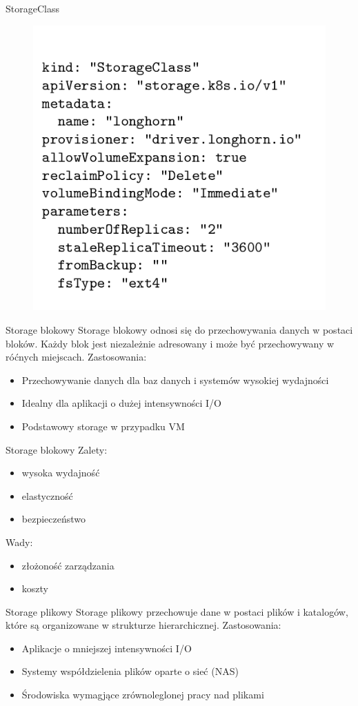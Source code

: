 \documentclass[polish,envcountsect,10pt]{beamer}
\begin{document}
\begin{frame}{StorageClass}
	\begin{figure}[H]
    	\includegraphics[width=0.5\linewidth]{images/sc.png}
	\end{figure}
\end{frame}

\begin{frame}{Storage blokowy}
	Storage blokowy odnosi się do przechowywania danych w postaci bloków. Każdy blok jest niezależnie adresowany i może być przechowywany w róćnych miejscach. Zastosowania:
	\begin{itemize}
		\item Przechowywanie danych dla baz danych i systemów wysokiej wydajności
		\item Idealny dla aplikacji o dużej intensywności I/O
		\item Podstawowy storage w przypadku VM
	\end{itemize}
\end{frame}

\begin{frame}{Storage blokowy}
	Zalety:
	\begin{itemize}
		\item wysoka wydajność
		\item elastyczność
		\item bezpieczeństwo
	\end{itemize}
	\medskip
	Wady:
	\begin{itemize}
		\item złożoność zarządzania
		\item koszty
	\end{itemize}
\end{frame}

\begin{frame}{Storage plikowy}
	Storage plikowy przechowuje dane w postaci plików i katalogów, które są organizowane w strukturze hierarchicznej. Zastosowania:
    \begin{itemize}
		\item Aplikacje o mniejszej intensywności I/O
		\item Systemy współdzielenia plików oparte o sieć (NAS)
		\item Środowiska wymagjące zrównoleglonej pracy nad plikami
	\end{itemize}
\end{frame}
\end{document}
